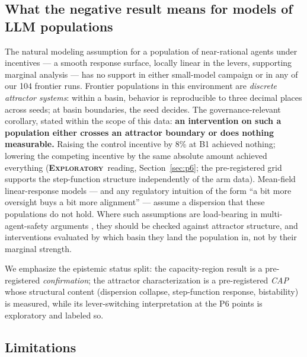 \documentclass{article} %
\newcommand{\expl}{\textbf{\textsc{Exploratory}}}
\begin{document}
\subsection{What the negative result means for models of LLM populations}

The natural modeling assumption for a population of near-rational agents under incentives --- a smooth response surface, locally linear in the levers, supporting marginal analysis --- has no support in either small-model campaign or in any of our 104 frontier runs. Frontier populations in this environment are \emph{discrete attractor systems}: within a basin, behavior is reproducible to three decimal places across seeds; at basin boundaries, the seed decides. The governance-relevant corollary, stated within the scope of this data: \textbf{an intervention on such a population either crosses an attractor boundary or does nothing measurable.} Raising the control incentive by 8\% at B1 achieved nothing; lowering the competing incentive by the same absolute amount achieved everything (\expl\ reading, Section~\ref{sec:p6}; the pre-registered grid supports the step-function structure independently of the arm data). Mean-field linear-response models --- and any regulatory intuition of the form ``a bit more oversight buys a bit more alignment'' --- assume a dispersion that these populations do not hold. Where such assumptions are load-bearing in multi-agent-safety arguments \citep{critch2020,hammond2025}, they should be checked against attractor structure, and interventions evaluated by which basin they land the population in, not by their marginal strength.

We emphasize the epistemic status split: the capacity-region result is a pre-registered \emph{confirmation}; the attractor characterization is a pre-registered \emph{CAP} whose structural content (dispersion collapse, step-function response, bistability) is measured, while its lever-switching interpretation at the P6 points is exploratory and labeled so.

\subsection{Limitations}
\label{sec:limitations}
\end{document}
